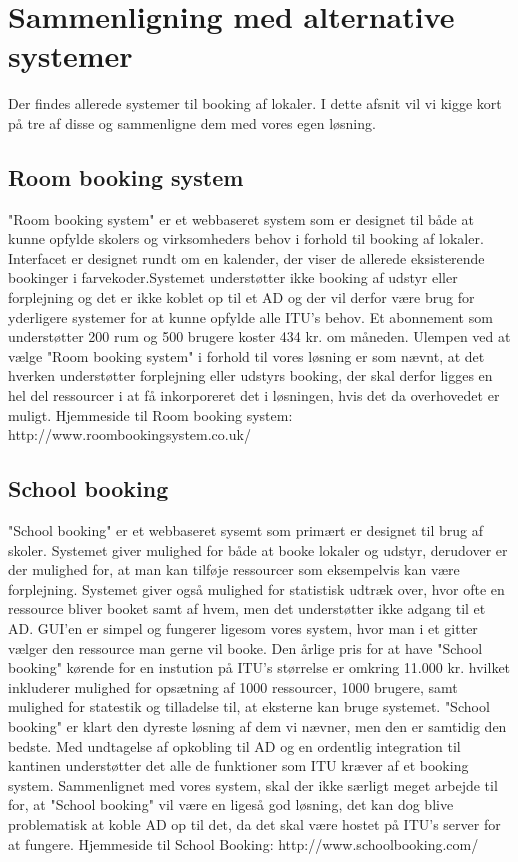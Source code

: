 \chapter{Sammenligning med alternative systemer}
Der findes allerede systemer til booking af lokaler. I dette afsnit vil vi kigge kort på tre af disse og sammenligne dem med vores egen løsning.

\section{Room booking system}
"Room booking system" er et webbaseret system som er designet til både at kunne opfylde skolers og virksomheders behov i forhold til booking af lokaler. Interfacet er designet rundt om en kalender, der viser de allerede eksisterende bookinger i farvekoder.Systemet understøtter ikke booking af udstyr eller forplejning og det er ikke koblet op til et AD og der vil derfor være brug for yderligere systemer for at kunne opfylde alle ITU's behov. Et abonnement som understøtter 200 rum og 500 brugere koster 434 kr. om måneden. Ulempen ved at vælge "Room booking system" i forhold til vores løsning er som nævnt, at det hverken understøtter forplejning eller udstyrs booking, der skal derfor ligges en hel del ressourcer i at få inkorporeret det i løsningen, hvis det da overhovedet er muligt.
Hjemmeside til Room booking system: http://www.roombookingsystem.co.uk/

\section{School booking}
"School booking" er et webbaseret sysemt som primært er designet til brug af skoler. Systemet giver mulighed for både at booke lokaler og udstyr, derudover er der mulighed for, at man kan tilføje ressourcer som eksempelvis kan være forplejning. Systemet giver også mulighed for statistisk udtræk over, hvor ofte en ressource bliver booket samt af hvem, men det understøtter ikke adgang til et AD. GUI'en er simpel og fungerer ligesom vores system, hvor man i et gitter vælger den ressource man gerne vil booke. Den årlige pris for at have "School booking" kørende for en instution på ITU's størrelse er omkring 11.000 kr. hvilket inkluderer mulighed for opsætning af 1000 ressourcer, 1000 brugere, samt mulighed for statestik og tilladelse til, at eksterne kan bruge systemet. "School booking" er klart den dyreste løsning af dem vi nævner, men den er samtidig den bedste. Med undtagelse af opkobling til AD og en ordentlig integration til kantinen understøtter det alle de funktioner som ITU kræver af et booking system. Sammenlignet med vores system, skal der ikke særligt meget arbejde til for, at "School booking" vil være en ligeså god løsning, det kan dog blive problematisk at koble AD op til det, da det skal være hostet på ITU's server for at fungere. 
Hjemmeside til School Booking: http://www.schoolbooking.com/

